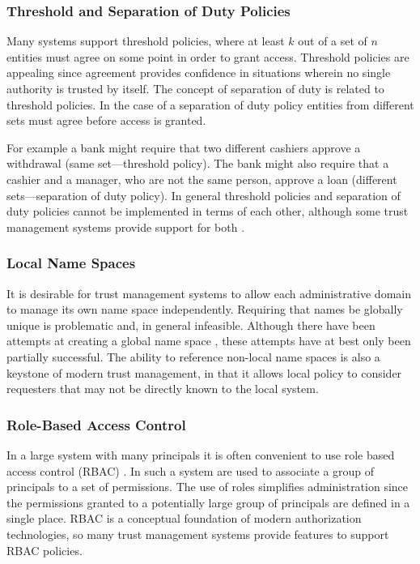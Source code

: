 
\subsubsection{Threshold and Separation of Duty Policies} Many systems
support threshold policies, where at least $k$ out of a set of $n$ entities
must agree on some point in order to grant access. Threshold policies are
appealing since agreement provides confidence in situations wherein no
single authority is trusted by itself. The concept of separation of duty is
related to threshold policies. In the case of a separation of duty policy
entities from different sets must agree before access is granted.

For example a bank might require that two different cashiers approve a
withdrawal (same set---threshold policy). The bank might also require that a
cashier and a manager, who are not the same person, approve a loan
(different sets---separation of duty policy). In general threshold policies
and separation of duty policies cannot be implemented in terms of each
other, although some trust management systems provide support for both
\cite{Li:DRBTMF}.


\subsubsection{Local Name Spaces} It is desirable for trust management 
systems to allow each administrative domain to manage its own
name space independently.  Requiring that names be globally unique is
problematic and, in general infeasible. Although there have been
attempts at creating a global name space \cite{X500}, these attempts
have at best only been partially successful. The ability to reference
non-local name spaces is also a keystone of modern trust management,
in that it allows local policy to consider requesters that may not be
directly known to the local system.


\subsubsection{Role-Based Access Control} In a large system with many 
principals it is often convenient to use role based access control
(RBAC) \cite{Ferraiolo:RBAC,Sandhu:RBACM}. In such a system
 are used to associate a group of principals to a set
of permissions.  The use of roles simplifies administration since the
permissions granted to a potentially large group of principals are
defined in a single place.  RBAC is a conceptual foundation of modern
authorization technologies, so many trust management systems provide
features to support RBAC policies.

